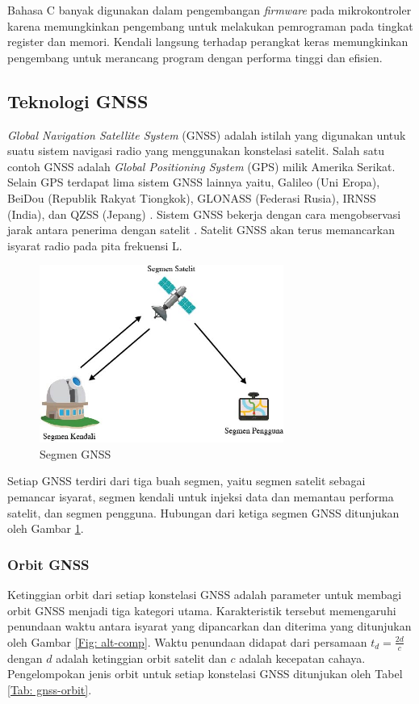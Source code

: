 Bahasa C banyak digunakan dalam pengembangan \textit{firmware} pada mikrokontroler karena memungkinkan pengembang untuk melakukan pemrograman pada tingkat register dan memori. Kendali langsung terhadap perangkat keras memungkinkan pengembang untuk merancang program dengan performa tinggi dan efisien.

\subsection{Teknologi GNSS}
\textit{Global Navigation Satellite System} (GNSS) adalah istilah yang digunakan untuk suatu sistem navigasi radio yang menggunakan konstelasi satelit. Salah satu contoh GNSS adalah \textit{Global Positioning System} (GPS) milik Amerika Serikat. Selain GPS terdapat lima sistem GNSS lainnya yaitu, Galileo (Uni Eropa), BeiDou (Republik Rakyat Tiongkok), GLONASS (Federasi Rusia), IRNSS (India), dan QZSS (Jepang) \cite{NationalCoordinationOfficeforSpace-BasedPositioning2021}. Sistem GNSS bekerja dengan cara mengobservasi jarak antara penerima dengan satelit \cite{TheEuropeanGlobalNavigationSatelliteSystemsAgency2021}. Satelit GNSS akan terus memancarkan isyarat radio pada pita frekuensi L.

\begin{figure}[ht]
	\centering
	\includegraphics[width=8cm]{contents/chapter-2/gnss_segment.jpg}
	\caption{Segmen GNSS}
	\label{Fig: gnss_segment}
\end{figure}

Setiap GNSS terdiri dari tiga buah segmen, yaitu segmen satelit sebagai pemancar isyarat, segmen kendali untuk injeksi data dan memantau performa satelit, dan segmen pengguna. Hubungan dari ketiga segmen GNSS ditunjukan oleh Gambar \ref{Fig: gnss_segment}. 

\subsubsection{Orbit GNSS}
Ketinggian orbit dari setiap konstelasi GNSS adalah parameter untuk membagi orbit GNSS menjadi tiga kategori utama. Karakteristik tersebut memengaruhi penundaan waktu antara isyarat yang dipancarkan dan diterima yang ditunjukan oleh Gambar \ref{Fig: alt-comp}. Waktu penundaan didapat dari persamaan $t_d = \frac{2d}{c}$ dengan $d$ adalah ketinggian orbit satelit dan $c$ adalah kecepatan cahaya. Pengelompokan jenis orbit untuk setiap konstelasi GNSS ditunjukan oleh Tabel \ref{Tab: gnss-orbit}.


